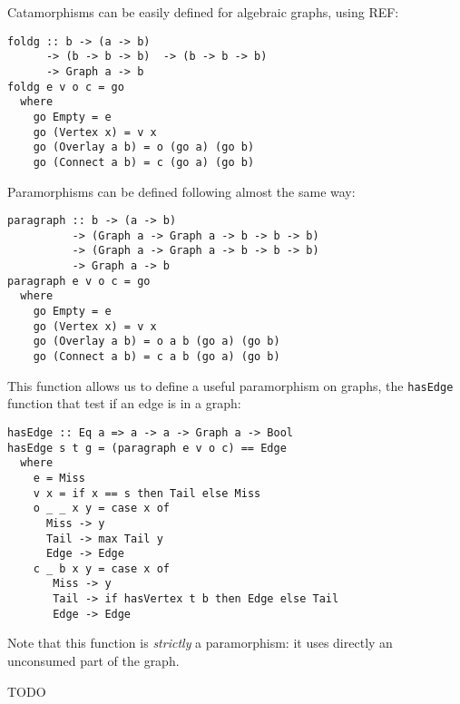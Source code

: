 \documentclass[sigplan]{acmart}
\begin{document}
Catamorphisms can be easily defined for algebraic graphs, using REF:
\begin{verbatim}
foldg :: b -> (a -> b)
      -> (b -> b -> b)  -> (b -> b -> b) 
      -> Graph a -> b
foldg e v o c = go
  where
    go Empty = e
    go (Vertex x) = v x
    go (Overlay a b) = o (go a) (go b)
    go (Connect a b) = c (go a) (go b)
\end{verbatim}

Paramorphisms can be defined following almost the same way:
\begin{verbatim}
paragraph :: b -> (a -> b) 
          -> (Graph a -> Graph a -> b -> b -> b) 
          -> (Graph a -> Graph a -> b -> b -> b) 
          -> Graph a -> b
paragraph e v o c = go
  where
    go Empty = e
    go (Vertex x) = v x
    go (Overlay a b) = o a b (go a) (go b)
    go (Connect a b) = c a b (go a) (go b)
\end{verbatim}

This function allows us to define a useful paramorphism on graphs, the \verb|hasEdge| function that test if an edge is in a graph:

\begin{verbatim}
hasEdge :: Eq a => a -> a -> Graph a -> Bool
hasEdge s t g = (paragraph e v o c) == Edge
  where
    e = Miss
    v x = if x == s then Tail else Miss
    o _ _ x y = case x of
      Miss -> y
      Tail -> max Tail y
      Edge -> Edge
    c _ b x y = case x of
       Miss -> y
       Tail -> if hasVertex t b then Edge else Tail
       Edge -> Edge
\end{verbatim}

Note that this function is \emph{strictly} a paramorphism: it uses directly an unconsumed part of the graph.

\begin{acks}
TODO
\end{acks}
	



\end{document}
